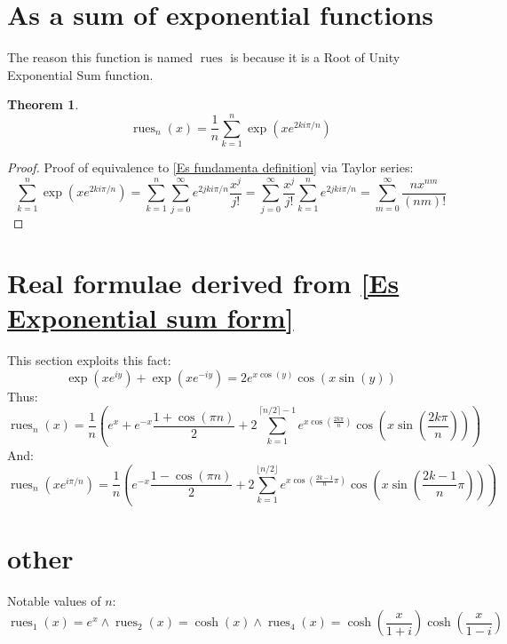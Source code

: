 \documentclass[]{article}
\DeclareMathOperator{\rues}{rues}
\newcommand{\pqty}[1]{{\left(#1\right)}}
\newtheorem{theorem}{Theorem}[section]
\numberwithin{equation}{section}
\begin{document}
	
	
	\section{As a sum of exponential functions}
	The reason this function is named $\rues$ is because it is a Root of Unity Exponential Sum function.
	\begin{theorem}
		\begin{equation}
		\label{Es Exponential sum form}
		\rues_n\pqty{x}=
		\frac{1}{n}\sum _{k=1}^n \exp\pqty{xe^{2ki\pi/n}}
		\end{equation}
	\end{theorem}
	\begin{proof}
		Proof of equivalence to \eqref{Es fundamenta definition} via Taylor series:
		\begin{equation}
		\sum _{k=1}^n \exp\pqty{xe^{2ki\pi/n}}
		=
		\sum _{k=1}^n \sum _{j=0}^\infty e^{2jki\pi/n}\frac{x^j}{j!}
		=
		\sum _{j=0}^\infty \frac{x^j}{j!} \sum _{k=1}^n e^{2jki\pi/n}
		=
		\sum_{m=0}^{\infty}\frac{nx^{nm}}{\pqty{nm}!}
		\end{equation}
	\end{proof}
	
	
	\section{Real formulae derived from \eqref{Es Exponential sum form}}
	This section exploits this fact:
	\begin{equation}
	\exp\pqty{xe^{iy}}+\exp\pqty{xe^{-iy}}
	=
	2e^{x\cos\pqty{y}} \cos\pqty{x\sin\pqty{y}}
	\end{equation}
	Thus:
	\begin{equation}
	\label{Es trig sum form 1}
	\rues_n\pqty{x}
	=
	\frac{1}{n}\pqty{
		e^x+e^{-x}\frac{1+\cos\pqty{\pi n}}{2} 
		+2\sum _{k=1}^{\lceil n/2\rceil-1}e^{x\cos\pqty{\frac{2k\pi}{n}}} \cos\pqty{x\sin\pqty{\frac{2k\pi}{n}}}
	}
	\end{equation}
	And:
	\begin{equation}
	\rues_n\pqty{xe^{i\pi/n}}
	=
	\frac{1}{n}\pqty{
		e^{-x}\frac{1-\cos\pqty{\pi n}}{2}
		+2\sum _{k=1}^{\lfloor n/2\rfloor}e^{x\cos\pqty{\frac{2k-1}{n}\pi}} \cos\pqty{x\sin\pqty{\frac{2k-1}{n}\pi}}
	}
	\end{equation}
	
	
	
	\section{other}
	Notable values of \(n\):
	\begin{equation}
	\rues_1\pqty{x}=e^x\land\rues_2\pqty{x}=\cosh\pqty{x}\land\rues_4\pqty{x}=\cosh\pqty{\frac{x}{1+i}}\cosh\pqty{\frac{x}{1-i}}
	\end{equation}
	
\end{document}

